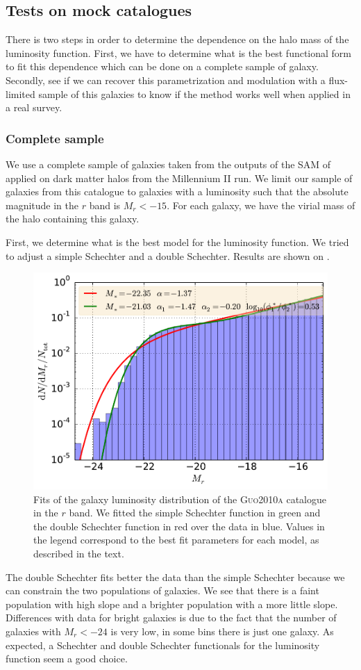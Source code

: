 \subsection{Tests on mock catalogues}

There is two steps in order to determine the dependence on the halo mass of the
luminosity function. First, we have to determine what is the best functional
form to fit this dependence which can be done on a complete sample of galaxy.
Secondly, see if we can recover this parametrization and modulation with a
flux-limited sample of this galaxies to know if the method works well when
applied in a real survey.

\subsubsection{Complete sample}

We use a complete sample of galaxies taken from the outputs of the SAM of
\citet{Guo+11} applied on dark matter halos from the Millennium II run. We
limit our sample of galaxies from this catalogue to galaxies with a luminosity
such that the absolute magnitude in the $r$ band is $M_r<-15$. For each galaxy,
we have the virial mass of the halo containing this galaxy.

First, we determine what is the best model for the luminosity function. We
tried to adjust a simple Schechter and a double Schechter. Results are
shown on .
%
\begin{figure}
    \centering
    \includegraphics[width=0.7\linewidth]{figures/lf/guo_all}
    \caption{Fits of the galaxy luminosity distribution of the
        \textsc{Guo2010a} catalogue in the $r$ band. We fitted the simple
        Schechter function in green and the double Schechter function in red
        over the data in blue. Values in the legend correspond to the best fit
    parameters for each model, as described in the text.\label{fig:guo_all}}
\end{figure}
%
The double Schechter fits better the data than the simple Schechter because we
can constrain the two populations of galaxies. We see that there is a faint
population with high slope and a brighter population with a more little slope.
Differences with data for bright galaxies is due to the fact that the number of
galaxies with $M_r<-24$ is very low, in some bins there is just one galaxy. As
expected, a Schechter and double Schechter functionals for the luminosity
function seem a good choice.

